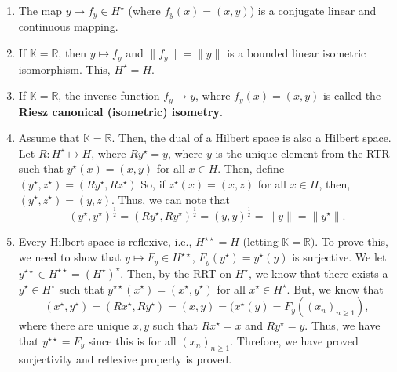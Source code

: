 \documentclass[12pt]{article}
\newcommand{\R}{{\mathbb R}}
\def\K{\mathbb{K}}
\newcommand{\xs}{(x_n)_{n \geq 1} }
\newcommand{\Hss}{H^{\star \star}}
\newcommand{\xst}{x^{\star}}
\newcommand{\Hs}{H^{\star}}
\newcommand{\ys}{y^{\star}}
\newcommand{\yss}{y^{\star \star}}
\newcommand{\zs}{z^{\star}}
\begin{document}
\begin{enumerate}[topsep=-15pt, itemsep=0pt]
\item The map $y \mapsto f_y \in \Hs$ (where $f_y(x) = (x, y)$) is a conjugate linear and continuous mapping. 
\item If $\K = \R$, then $y \mapsto f_y$ and $\| f_y \| = \| y\|$ is a bounded linear isometric isomorphism. This, $\Hs = H$.
\item If $\K = \R$, the inverse function $f_y \mapsto y$, where $f_y(x) = (x, y)$ is called the \textbf{Riesz canonical (isometric) isometry}.
\item Assume that $\K = \R$. Then, the dual of a Hilbert space is also a Hilbert space. Let $R: \Hs \mapsto H$, where $R\ys = y$, where $y$ is the unique element from the RTR such that $\ys(x) = (x, y)$ for all $x \in H$. Then, define $(\ys, z^{\star}) = (R \ys, R z^{\star})$ So, if $\zs(x) = (x, z)$ for all $x \in H$, then, $(\ys, \zs) = (y, z)$. Thus, we can note that 
\[ (\ys, \ys)^{\frac{1}{2}} = (R \ys, R \ys)^{\frac{1}{2}} = (y, y)^{\frac{1}{2}} = \| y \| = \| \ys \|. \]
\item Every Hilbert space is reflexive, i.e., $\Hss = H$ (letting $\K = \R)$. To prove this, we need to show that $y \mapsto F_y \in \Hss$, $F_y(\ys) = \ys(y)$ is surjective. We let $\yss \in \Hss = (\Hs)^{\star}$. Then, by the RRT on $\Hs$, we know that there exists a $\ys \in \Hs$ such that $\yss(\xst) = (\xst, \ys)$ for all $\xst \in \Hs$. But, we know that 
\[ (\xst, \ys) = (R \xst, R \ys) = (x, y) = (\xst(y) = F_y(\xs),\]
where there are unique $x, y$ such that $R\xst = x$ and $R\ys = y$. Thus, we have that $\yss = F_y$ since this is for all $\xs$. Threfore, we have proved surjectivity and reflexive property is proved. 
\end{enumerate}
\end{document}
